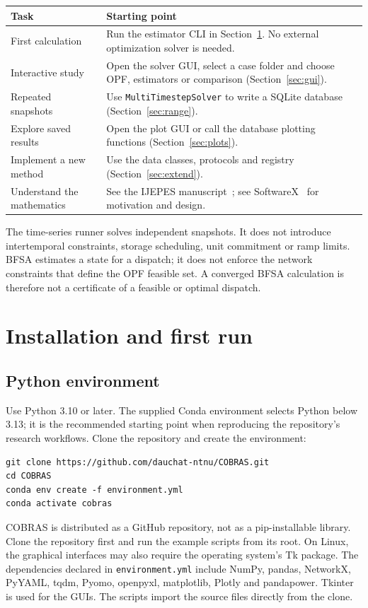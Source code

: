 \documentclass[11pt,a4paper]{article}
\newcommand{\code}[1]{\nolinkurl{#1}}
\begin{document}
\begin{longtable}{p{.22\linewidth}p{.70\linewidth}}
\toprule Task & Starting point \\\midrule\endhead
First calculation & Run the estimator CLI in Section~\ref{sec:install}. No external optimization solver is needed.\\
Interactive study & Open the solver GUI, select a case folder and choose OPF, estimators or comparison (Section~\ref{sec:gui}).\\
Repeated snapshots & Use \code{MultiTimestepSolver} to write a SQLite database (Section~\ref{sec:range}).\\
Explore saved results & Open the plot GUI or call the database plotting functions (Section~\ref{sec:plots}).\\
Implement a new method & Use the data classes, protocols and registry (Section~\ref{sec:extend}).\\
Understand the mathematics & See the IJEPES manuscript~\cite{ijepes}; see SoftwareX~\cite{softwarex} for motivation and design.\\
\bottomrule
\end{longtable}

The time-series runner solves independent snapshots. It does not introduce
intertemporal constraints, storage scheduling, unit commitment or ramp limits.
BFSA estimates a state for a dispatch; it does not enforce the network
constraints that define the OPF feasible set. A converged BFSA calculation is
therefore not a certificate of a feasible or optimal dispatch.

\section{Installation and first run}
\label{sec:install}
\subsection{Python environment}
Use Python 3.10 or later. The supplied Conda environment selects Python below
3.13; it is the recommended starting point when reproducing the repository's
research workflows. Clone the repository and create the environment:
\begin{lstlisting}
git clone https://github.com/dauchat-ntnu/COBRAS.git
cd COBRAS
conda env create -f environment.yml
conda activate cobras
\end{lstlisting}
COBRAS is distributed as a GitHub repository, not as a pip-installable library.
Clone the repository first and run the example scripts from its root. On Linux, the graphical interfaces may
also require the operating system's Tk package. The dependencies declared in
\code{environment.yml} include NumPy, pandas, NetworkX, PyYAML, tqdm, Pyomo,
openpyxl, matplotlib, Plotly and pandapower. Tkinter is used for the GUIs.
The scripts import the source files directly from the clone.
\end{document}

